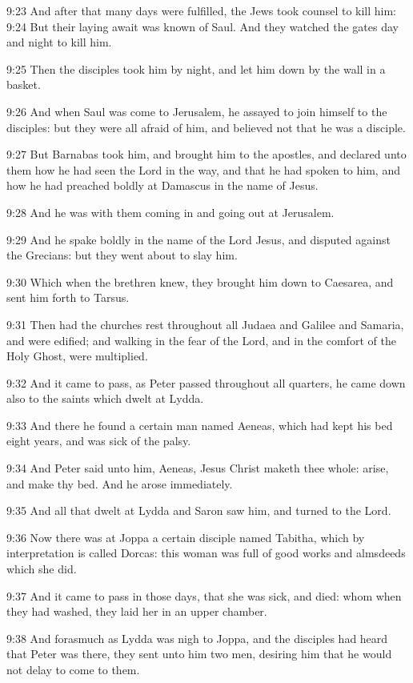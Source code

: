 9:23 And after that many days were fulfilled, the Jews took counsel to kill him: 9:24 But their laying await was known of Saul. And they watched the gates day and night to kill him.

9:25 Then the disciples took him by night, and let him down by the wall in a basket.

9:26 And when Saul was come to Jerusalem, he assayed to join himself to the disciples: but they were all afraid of him, and believed not that he was a disciple.

9:27 But Barnabas took him, and brought him to the apostles, and declared unto them how he had seen the Lord in the way, and that he had spoken to him, and how he had preached boldly at Damascus in the name of Jesus.

9:28 And he was with them coming in and going out at Jerusalem.

9:29 And he spake boldly in the name of the Lord Jesus, and disputed against the Grecians: but they went about to slay him.

9:30 Which when the brethren knew, they brought him down to Caesarea, and sent him forth to Tarsus.

9:31 Then had the churches rest throughout all Judaea and Galilee and Samaria, and were edified; and walking in the fear of the Lord, and in the comfort of the Holy Ghost, were multiplied.

9:32 And it came to pass, as Peter passed throughout all quarters, he came down also to the saints which dwelt at Lydda.

9:33 And there he found a certain man named Aeneas, which had kept his bed eight years, and was sick of the palsy.

9:34 And Peter said unto him, Aeneas, Jesus Christ maketh thee whole: arise, and make thy bed. And he arose immediately.

9:35 And all that dwelt at Lydda and Saron saw him, and turned to the Lord.

9:36 Now there was at Joppa a certain disciple named Tabitha, which by interpretation is called Dorcas: this woman was full of good works and almsdeeds which she did.

9:37 And it came to pass in those days, that she was sick, and died: whom when they had washed, they laid her in an upper chamber.

9:38 And forasmuch as Lydda was nigh to Joppa, and the disciples had heard that Peter was there, they sent unto him two men, desiring him that he would not delay to come to them.

